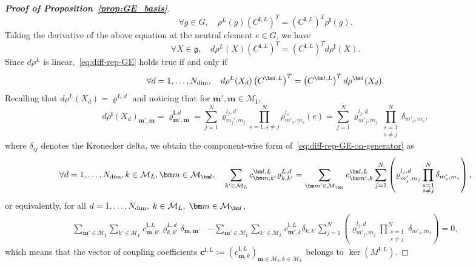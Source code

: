\documentclass{article}
\newcommand{\vrho}[2]{\varrho^{#1}_{#2}}
\newcommand{\rep}[2]{\rho^{#1}_{#2}}
\newcommand{\dd}{{d}}
\numberwithin{equation}{section}
\def\bc{{\bm c}}
\def\bl{{\bm l}}
\def\bbm{{\bm m}}
\def\calM{\mathcal{M}}
\def\Nat{{N}}
\begin{document}
\begin{proof}[\bf{Proof of Proposition~\ref{prop:GE_basis}}]
\begin{equation}
\label{eq:matrix_GE_sylvester}
        \forall g\in G, \quad \rep{L}{}(g)\left(C^{\bl,L}\right)^T = \left(C^{\bl,L}\right)^T\rep{\bl}{}(g).
\end{equation}
Taking the derivative of the above equation at the neutral element $e\in G$, we have
\begin{equation}\label{eq:diff-rep-GE}
    \forall X\in\mathfrak g, \quad d\rep{L}{}(X)\left(C^{\bl,L}\right)^T = \left(C^{\bl,L}\right)^Td\rep{\bl}{}(X).
\end{equation}
Since $d\rep{L}{}$ is linear,~\eqref{eq:diff-rep-GE} holds true if and only if
\begin{equation}\label{eq:diff-rep-GE-on-generator}
    \forall\dd=1,\ldots,N_{\rm{dim}},\quad d\rep{L}{}(X_\dd)\left(C^{\bl,L}\right)^T = \left(C^{\bl,L}\right)^Td\rep{\bl}{}(X_\dd).
\end{equation}
Recalling that $d\rep{L}{}(X_\dd) = \vrho{L,\dd}{}$ and noticing that for $\bbm',\bbm\in\calM_{\bl}$, 
\begin{equation}\label{eq:drho}
    d\rep{\bl}{}(X_\dd)_{\bbm',\bbm} = \vrho{\bl,\dd}{\bbm',\bbm}= \sum_{j=1}^\Nat \vrho{l_j,\dd}{m_j',m_j}\prod_{s=1,s\ne j}^\Nat \rep{l_s}{m'_s,m_s}(e)= 
    \sum_{j=1}^\Nat \vrho{l_j,\dd}{m'_j,m_j}\prod_{\substack{s=1 \\ s\ne j }}^N \delta_{m'_s,m_s},
\end{equation}
where $\delta_{ij}$ denotes the Kronecker delta,
we obtain the component-wise form of~\eqref{eq:diff-rep-GE-on-generator} as
\[
    \forall \dd=1,\ldots,N_{\rm dim}, k\in\calM_L, \bbm \in \calM_\bl, \quad
    \sum_{k'\in\calM_L}c_{\bbm,k'}^{\bl,L} \vrho{L,\dd}{k,k'}  
    = \sum_{\bbm' \in \calM_\bl} c_{\bbm',k}^{\bl,L}
    \sum_{j=1}^\Nat \left( \vrho{l_j,\dd}{m'_j,m_j}\prod_{\substack{s=1 \\s\ne j}}^\Nat \delta_{m'_s,m_s} \right),  
\]
or equivalently, for all $\dd=1,\ldots,N_{\rm dim},\; k\in\calM_L,\; \bbm \in \calM_\bl$, 
\begin{align*}
    \sum_{\bbm' \in \calM_\bl} \sum_{k'\in\calM_L}c_{\bbm,k'}^{\bl,L} \vrho{L,\dd}{k,k'}  \delta_{\bbm,\bbm'}
    & - \sum_{\bbm' \in \calM_\bl} \sum_{k'\in\calM_L} c_{\bbm',k}^{\bl,L} \delta_{k,k'}
    \sum_{j=1}^\Nat \left( \vrho{l_j,\dd}{m'_j,m_j}\prod_{\substack{s=1 \\s\ne j}}^\Nat \delta_{m'_s,m_s} \right) = 0,  
\end{align*}
which means that the vector of coupling coefficients $\bc^{\bl,L}:=\left(c_{\bbm,k}^{\bl,L}\right)_{\bbm\in\mathcal{M}_\bl,k\in\mathcal{M}_L}$ belongs to $\ker(M^{\bl,L})$. 


\end{proof}
\end{document}
